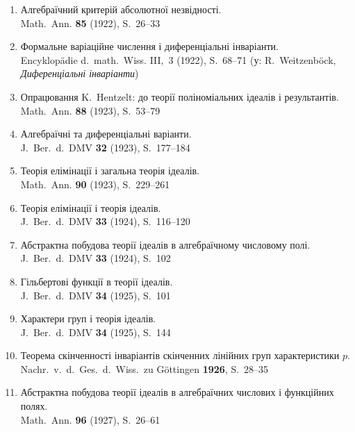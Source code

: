\documentclass[11pt]{article}
\newcommand{\foreign}[1]{#1}
\begin{document}
\begin{enumerate}[label={\small\arabic*.},leftmargin=2em,itemsep=0.3em]
\item Алгебраїчний критерій абсолютної незвідності.\\
\foreign{Math.\ Ann.} \textbf{85} (1922), S.~26--33

\item Формальне варіаційне числення і диференціальні інваріанти.\\
\foreign{Encyklopädie d.\ math.\ Wiss.} III,\ 3 (1922), S.~68--71 (у:
R.\ Weitzenböck, \textit{Диференціальні інваріанти})

\item Опрацювання K.\ Hentzelt: до теорії поліноміальних ідеалів і результантів.\\
\foreign{Math.\ Ann.} \textbf{88} (1923), S.~53--79

\item Алгебраїчні та диференціальні варіанти.\\
\foreign{J.\ Ber.\ d.\ DMV} \textbf{32} (1923), S.~177--184

\item Теорія елімінації і загальна теорія ідеалів.\\
\foreign{Math.\ Ann.} \textbf{90} (1923), S.~229--261

\item Теорія елімінації і теорія ідеалів.\\
\foreign{J.\ Ber.\ d.\ DMV} \textbf{33} (1924), S.~116--120

\item Абстрактна побудова теорії ідеалів в алгебраїчному числовому полі.\\
\foreign{J.\ Ber.\ d.\ DMV} \textbf{33} (1924), S.~102

\item Гільбертові функції в теорії ідеалів.\\
\foreign{J.\ Ber.\ d.\ DMV} \textbf{34} (1925), S.~101

\item Характери груп і теорія ідеалів.\\
\foreign{J.\ Ber.\ d.\ DMV} \textbf{34} (1925), S.~144

\item Теорема скінченності інваріантів скінченних лінійних груп характеристики $p$.\\
\foreign{Nachr.\ v.\ d.\ Ges.\ d.\ Wiss.\ zu Göttingen} \textbf{1926}, S.~28--35

\item Абстрактна побудова теорії ідеалів в алгебраїчних числових і функційних полях.\\
\foreign{Math.\ Ann.} \textbf{96} (1927), S.~26--61


\end{enumerate}
\end{document}

